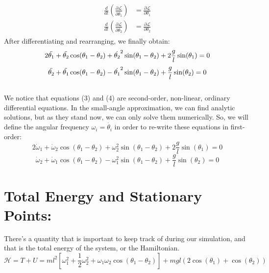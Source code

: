\documentclass{article}
\begin{document}
\begin{align*}
\begin{split}
    \frac{d}{dt}(\frac{\partial\mathcal{L}}{\partial\dot{\theta_1}}) & = \frac{\partial\mathcal{L}}{\partial\theta_1} \\ 
        \frac{d}{dt}(\frac{\partial\mathcal{L}}{\partial\dot{\theta_2}}) & = \frac{\partial\mathcal{L}}{\partial\theta_2}
\end{split}
\end{align*}
After differentiating and rearranging, we finally obtain:
\begin{equation}
    2\Ddot{\theta_1} + \Ddot{\theta_2}\cos(\theta_1 - \theta_2) + \dot{\theta_2}^2\sin(\theta_1-\theta_2) + 2\frac{g}{l}\sin(\theta_1) = 0
\end{equation}
\begin{equation}
   \Ddot{\theta_2} + \Ddot{\theta_1}\cos(\theta_1 - \theta_2) - \dot{\theta_1}^2\sin(\theta_1-\theta_2) + \frac{g}{l}\sin(\theta_2) = 0
\end{equation}
\\We notice that equations (3) and (4) are second-order, non-linear, ordinary differential equations. In the small-angle approximation, we can find analytic solutions, but as they stand now, we can only solve them numerically. So, we will define the angular frequency $\omega_i = \dot{\theta_i}$ in order to re-write these equations in first-order:
\begin{equation}
    2\dot{\omega}_1 + \dot{\omega}_2\cos(\theta_1 - \theta_2) + \omega_2^2\sin(\theta_1-\theta_2) + 2\frac{g}{l}\sin(\theta_1) = 0
\end{equation}
\begin{equation}
   \dot{\omega}_2 + \dot{\omega}_1\cos(\theta_1 - \theta_2) - \omega_1^2\sin(\theta_1-\theta_2) + \frac{g}{l}\sin(\theta_2) = 0
\end{equation}

\section{Total Energy and Stationary Points:}
There's a quantity that is important to keep track of during our simulation, and that is the total energy of the system, or the Hamiltonian.
\begin{equation}
    \mathcal{H} = T + U = ml^2[\omega_1^2 + \frac{1}{2}\omega_2^2 + \omega_1\omega_2\cos(\theta_1-\theta_2)] + mgl(2\cos(\theta_1) + \cos(\theta_2))
\end{equation}
\end{document}

